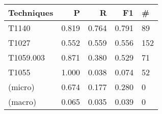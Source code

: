 \begin{tabular}{lrrrl}
\toprule
Techniques & P & R & F1 & \# \\
\midrule
T1140 & 0.819 & 0.764 & 0.791 & 89 \\
T1027 & 0.552 & 0.559 & 0.556 & 152 \\
T1059.003 & 0.871 & 0.380 & 0.529 & 71 \\
T1055 & 1.000 & 0.038 & 0.074 & 52 \\
(micro) & 0.674 & 0.177 & 0.280 & 0 \\
(macro) & 0.065 & 0.035 & 0.039 & 0 \\
\bottomrule
\end{tabular}
